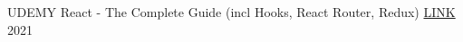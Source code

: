 


\begin{cventries}


\cventry
{UDEMY} %
{React - The Complete Guide (incl Hooks, React Router, Redux)} %
{\href{https://www.udemy.com/certificate/UC-76de0794-aca1-4e94-8f62-f791573322a0/}{\color{awesome-skyblue}LINK}} %
{2021} %
{ %
}


\end{cventries}